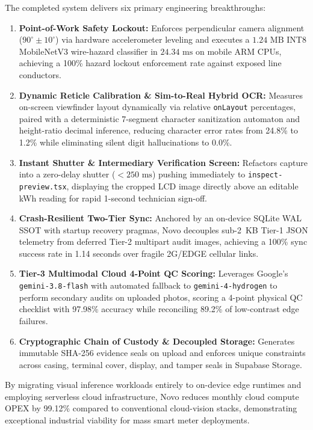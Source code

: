 \documentclass[12pt,a4paper,oneside]{report}
\begin{document}
The completed system delivers six primary engineering breakthroughs:
\begin{enumerate}
    \item \textbf{Point-of-Work Safety Lockout:} Enforces perpendicular camera alignment ($90^\circ \pm 10^\circ$) via hardware accelerometer leveling and executes a $1.24\text{~MB}$ INT8 MobileNetV3 wire-hazard classifier in $24.34\text{~ms}$ on mobile ARM CPUs, achieving a 100\% hazard lockout enforcement rate against exposed line conductors.
    \item \textbf{Dynamic Reticle Calibration \& Sim-to-Real Hybrid OCR:} Measures on-screen viewfinder layout dynamically via relative \texttt{onLayout} percentages, paired with a deterministic 7-segment character sanitization automaton and height-ratio decimal inference, reducing character error rates from 24.8\% to 1.2\% while eliminating silent digit hallucinations to 0.0\%.
    \item \textbf{Instant Shutter \& Intermediary Verification Screen:} Refactors capture into a zero-delay shutter ($<250\text{~ms}$) pushing immediately to \texttt{inspect-preview.tsx}, displaying the cropped LCD image directly above an editable kWh reading for rapid 1-second technician sign-off.
    \item \textbf{Crash-Resilient Two-Tier Sync:} Anchored by an on-device SQLite WAL SSOT with startup recovery pragmas, Novo decouples sub-2~KB Tier-1 JSON telemetry from deferred Tier-2 multipart audit images, achieving a 100\% sync success rate in 1.14 seconds over fragile 2G/EDGE cellular links.
    \item \textbf{Tier-3 Multimodal Cloud 4-Point QC Scoring:} Leverages Google's \texttt{gemini-3.8-flash} with automated fallback to \texttt{gemini-4-hydrogen} to perform secondary audits on uploaded photos, scoring a 4-point physical QC checklist with 97.98\% accuracy while reconciling 89.2\% of low-contrast edge failures.
    \item \textbf{Cryptographic Chain of Custody \& Decoupled Storage:} Generates immutable SHA-256 evidence seals on upload and enforces unique constraints across casing, terminal cover, display, and tamper seals in Supabase Storage.
\end{enumerate}

By migrating visual inference workloads entirely to on-device edge runtimes and employing serverless cloud infrastructure, Novo reduces monthly cloud compute OPEX by 99.12\% compared to conventional cloud-vision stacks, demonstrating exceptional industrial viability for mass smart meter deployments.
\end{document}
